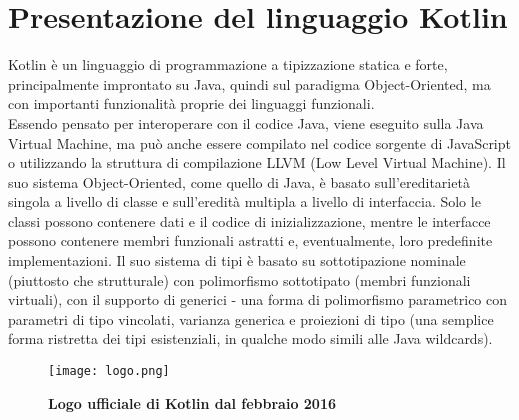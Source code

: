
\chapter{Presentazione del linguaggio Kotlin}\label{ch:presentazione}

Kotlin \cite{kotlinLang} è un linguaggio di programmazione a tipizzazione statica e forte, principalmente improntato su Java,
quindi sul paradigma Object-Oriented, ma con importanti funzionalità proprie dei linguaggi funzionali.\\
Essendo pensato per interoperare con il codice Java, viene eseguito sulla Java Virtual Machine,
ma può anche essere compilato nel codice sorgente di JavaScript o utilizzando la struttura di compilazione LLVM \cite{LLVMWiki}
(Low Level Virtual Machine). Il suo sistema Object-Oriented, come quello di Java, è basato sull'ereditarietà
singola a livello di classe e sull'eredità multipla a livello di interfaccia. Solo le classi possono contenere dati e il codice di inizializzazione, mentre le interfacce possono contenere membri funzionali astratti e, eventualmente, loro predefinite implementazioni. Il suo sistema di tipi è basato su sottotipazione nominale (piuttosto che strutturale) con polimorfismo sottotipato (membri funzionali virtuali), con il supporto di generici - una forma di polimorfismo parametrico con parametri di tipo vincolati, varianza generica e proiezioni di tipo (una semplice forma ristretta dei tipi esistenziali, in qualche modo simili alle Java wildcards).\\

\begin{figure}[htbp]
  \centering
  \texttt{[image: logo.png]}
  \caption{{\bfseries Logo ufficiale di Kotlin dal febbraio 2016}}
  \label{logoKt}
\end{figure}

